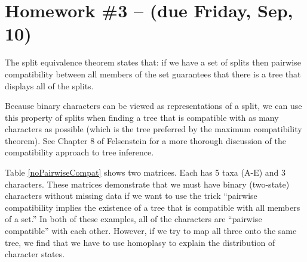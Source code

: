 \documentclass[11pt]{article}
\begin{document}
\section*{Homework \#3 -- (due Friday, Sep, 10)}
\small
The split equivalence theorem states that: if we have a set of splits then pairwise compatibility between all members of the set guarantees that
there is a tree that displays all of the splits.

Because binary characters can be viewed as representations of a split, we can use this property of splits when finding a tree that is compatible with as many characters as possible (which is the tree preferred by the maximum compatibility theorem). See Chapter 8 of Felsenstein for a more thorough discussion of the compatibility approach to tree inference.

Table \ref{noPairwiseCompat} shows two matrices. Each has 5 taxa (A-E) and 3 characters.
These matrices demonstrate that we must have binary (two-state) characters without missing data if we want to use the trick ``pairwise compatibility implies the existence of a tree that is compatible with all members of a set.''  In both of these examples, all of the characters are ``pairwise compatible'' with each other. However, if we try to map all three onto the same tree, we find that we have to use homoplasy to explain the distribution of character states.
\end{document}
